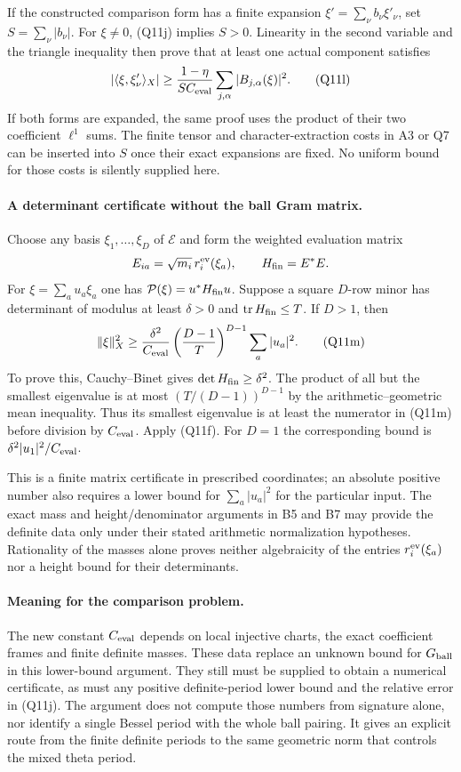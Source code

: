If the constructed comparison form has a finite expansion
$\xi'=\sum_\nu b_\nu\xi'_\nu$, set
$S=\sum_\nu|b_\nu|$.  For $\xi\ne0$, (Q11j) implies $S>0$.
Linearity in the second variable and the triangle inequality
then prove that at least one actual component satisfies
\[
 |\langle\xi,\xi'_\nu\rangle_X|
       \geq\frac{1-\eta}{S C_{\rm eval}}
                    \sum_{j,\alpha}|B_{j,\alpha}(\xi)|^2.
 \tag{Q11l}
\]
If both forms are expanded, the same proof uses the product
of their two coefficient $\ell^1$ sums.  The finite tensor and
character-extraction costs in A3 or Q7 can be inserted into
$S$ once their exact expansions are fixed.  No uniform bound
for those costs is silently supplied here.

\paragraph{A determinant certificate without the ball Gram matrix.}
Choose any basis $\xi_1,\ldots,\xi_D$ of $\mathcal E$ and form
the weighted evaluation matrix
\[
 E_{ia}=\sqrt{m_i}\,r_i^{\rm ev}(\xi_a),\qquad
 H_{\rm fin}=E^*E.
\]
For $\xi=\sum_a u_a\xi_a$ one has
$\mathcal P(\xi)=u^*H_{\rm fin}u$.  Suppose a square
$D$-row minor has determinant of modulus at least $\delta>0$
and $\operatorname{tr}H_{\rm fin}\leq T$.  If $D>1$, then
\[
 \|\xi\|_X^2
    \geq\frac{\delta^2}{C_{\rm eval}}
               \left(\frac{D-1}{T}\right)^{D-1}
                         \sum_a|u_a|^2 .
 \tag{Q11m}
\]
To prove this, Cauchy--Binet gives
$\det H_{\rm fin}\geq\delta^2$.  The product of all but
the smallest eigenvalue is at most
$(T/(D-1))^{D-1}$ by the arithmetic--geometric mean inequality.
Thus its smallest eigenvalue is at least the numerator in
(Q11m) before division by $C_{\rm eval}$.  Apply (Q11f).
For $D=1$ the corresponding bound is
$\delta^2|u_1|^2/C_{\rm eval}$.

This is a finite matrix certificate in prescribed coordinates;
an absolute positive number also requires a lower bound for
$\sum_a|u_a|^2$ for the particular input.  The exact mass and
height/denominator arguments in B5 and B7 may provide the
definite data only under their stated arithmetic normalization
hypotheses.  Rationality of the masses alone proves neither
algebraicity of the entries $r_i^{\rm ev}(\xi_a)$ nor a height
bound for their determinants.

\paragraph{Meaning for the comparison problem.}
The new constant $C_{\rm eval}$ depends on local injective
charts, the exact coefficient frames and finite definite
masses.  These data replace an unknown bound for
$G_{\rm ball}$ in this lower-bound argument.  They still must
be supplied to obtain a numerical certificate, as must any
positive definite-period lower bound and the relative error
in (Q11j).  The argument does not compute those numbers from
signature alone, nor identify a single Bessel period with the
whole ball pairing.  It gives an explicit route from the
finite definite periods to the same geometric norm that
controls the mixed theta period.

